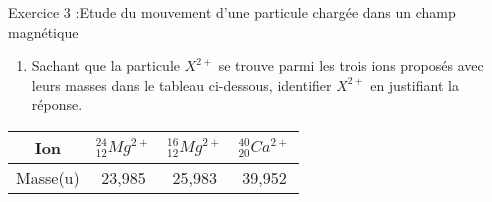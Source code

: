 \documentclass[12pt, french]{article}
\begin{document}
\begin{Box2}{Exercice 3 :Etude du mouvement d’une particule chargée dans un champ magnétique  }
\begin{enumerate}
		avec $R_{X^{2+}}$ le rayon de la trajectoire de la particule $X^{2+}$.

	\item Sachant que la particule $X^{2+}$ se trouve parmi les trois ions proposés avec leurs masses dans le
		tableau ci-dessous, identifier $X^{2+}$ en justifiant la réponse.


\end{enumerate}
\begin{center}
\begin{tabular}{ |c|| c| c|c| }
	\hline
	Ion & $^{24}_{12}Mg^{2+}$ &$^{16}_{12}Mg^{2+}$ &$^{40}_{20}Ca^{2+}$ \\\hline
	Masse(u) & 23,985 & 25,983 &39,952 \\\hline
\end{tabular}
\end{center}
\end{Box2}














\end{document}
